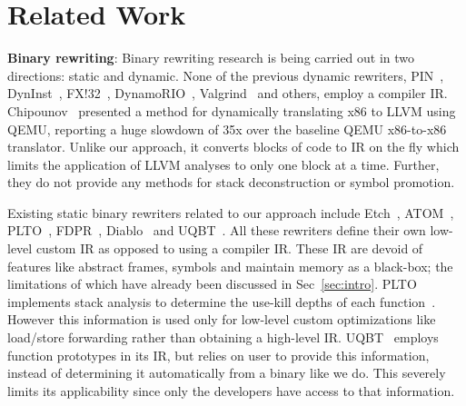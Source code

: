 \vspace{-2ex}
\section{Related Work}
\label{sec:related}
\textbf{Binary rewriting}: Binary rewriting research is being carried out in two directions: static and dynamic. None of the previous dynamic rewriters, PIN~\cite{pintool}, DynInst~\cite{dyninst94}, FX!32~\cite{fx32}, DynamoRIO~\cite{bruening2004eta}, Valgrind~\cite{valgrind} and others, employ a compiler IR. Chipounov~\cite{llvm-qemu} presented a method for dynamically translating x86 to LLVM using QEMU, reporting a huge slowdown of 35x over the baseline QEMU x86-to-x86 translator. Unlike our approach, it converts blocks of code to IR on the fly which limits the application of LLVM analyses to only one block at a time. Further, they do not provide any methods for stack deconstruction or symbol promotion.




Existing static binary rewriters related to our approach include Etch~\cite{newEtch}, ATOM~\cite{atom}, PLTO~\cite{plto}, FDPR~\cite{ibm-fdpr}, Diablo~\cite{Diablo1} and UQBT~\cite{cifuentes00}. All these rewriters define their own low-level custom IR as opposed to using a compiler IR. These IR are devoid of features like abstract frames, symbols and maintain memory as a black-box; the limitations of which have already been discussed in Sec~\ref{sec:intro}. PLTO implements stack analysis to determine the use-kill depths of each function~\cite{plto}. However this information is used only for low-level custom optimizations like load/store forwarding rather than obtaining a high-level IR. UQBT~\cite{cifuentes00} employs function prototypes in its IR, but relies on user to provide this information, instead of determining it automatically from a binary like we do. This severely limits its applicability since only the developers have access to that information.


